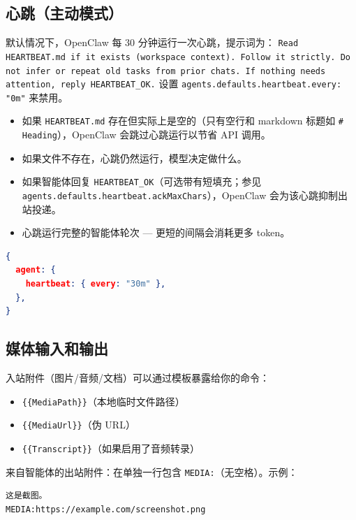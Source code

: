 \subsection{心跳（主动模式）}


默认情况下，OpenClaw 每 30 分钟运行一次心跳，提示词为：
\texttt{Read HEARTBEAT.md if it exists (workspace context). Follow it strictly. Do not infer or repeat old tasks from prior chats. If nothing needs attention, reply HEARTBEAT\_OK.}
设置 \texttt{agents.defaults.heartbeat.every: "0m"} 来禁用。

\begin{itemize}
  \item 如果 \texttt{HEARTBEAT.md} 存在但实际上是空的（只有空行和 markdown 标题如 \texttt{\# Heading}），OpenClaw 会跳过心跳运行以节省 API 调用。
  \item 如果文件不存在，心跳仍然运行，模型决定做什么。
  \item 如果智能体回复 \texttt{HEARTBEAT\_OK}（可选带有短填充；参见 \texttt{agents.defaults.heartbeat.ackMaxChars}），OpenClaw 会为该心跳抑制出站投递。
  \item 心跳运行完整的智能体轮次 — 更短的间隔会消耗更多 token。
\end{itemize}


\begin{lstlisting}[language=json]
{
  agent: {
    heartbeat: { every: "30m" },
  },
}
\end{lstlisting}


\subsection{媒体输入和输出}


入站附件（图片/音频/文档）可以通过模板暴露给你的命令：

\begin{itemize}
  \item \texttt{\{\{MediaPath\}\}}（本地临时文件路径）
  \item \texttt{\{\{MediaUrl\}\}}（伪 URL）
  \item \texttt{\{\{Transcript\}\}}（如果启用了音频转录）
\end{itemize}


来自智能体的出站附件：在单独一行包含 \texttt{MEDIA:}（无空格）。示例：

\begin{lstlisting}
这是截图。
MEDIA:https://example.com/screenshot.png
\end{lstlisting}


